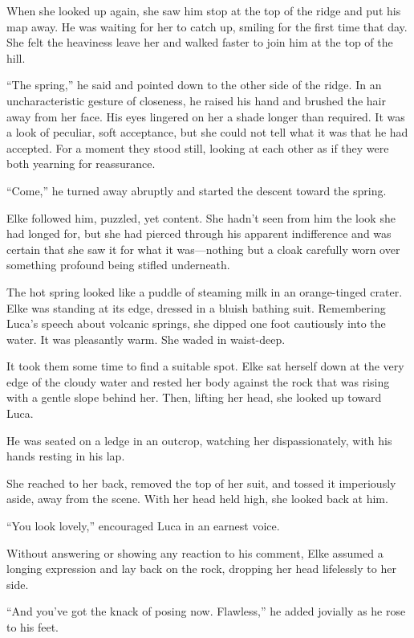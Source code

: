 When she looked up again, she saw him stop at the top of the ridge and put his map away. He was waiting for her to catch up, smiling for the first time that day. She felt the heaviness leave her and walked faster to join him at the top of the hill.

``The spring,'' he said and pointed down to the other side of the ridge. In an uncharacteristic gesture of closeness, he raised his hand and brushed the hair away from her face. His eyes lingered on her a shade longer than required. It was a look of peculiar, soft acceptance, but she could not tell what it was that he had accepted. For a moment they stood still, looking at each other as if they were both yearning for reassurance.

``Come,'' he turned away abruptly and started the descent toward the spring.

Elke followed him, puzzled, yet content. She hadn't seen from him the look she had longed for, but she had pierced through his apparent indifference and was certain that she saw it for what it was---nothing but a cloak carefully worn over something profound being stifled underneath.

\sectionline

The hot spring looked like a puddle of steaming milk in an orange-tinged crater. Elke was standing at its edge, dressed in a bluish bathing suit. Remembering Luca's speech about volcanic springs, she dipped one foot cautiously into the water. It was pleasantly warm. She waded in waist-deep.

It took them some time to find a suitable spot. Elke sat herself down at the very edge of the cloudy water and rested her body against the rock that was rising with a gentle slope behind her. Then, lifting her head, she looked up toward Luca.

He was seated on a ledge in an outcrop, watching her dispassionately, with his hands resting in his lap.

She reached to her back, removed the top of her suit, and tossed it imperiously aside, away from the scene. With her head held high, she looked back at him.

``You look lovely,'' encouraged Luca in an earnest voice.

Without answering or showing any reaction to his comment, Elke assumed a longing expression and lay back on the rock, dropping her head lifelessly to her side.

``And you've got the knack of posing now. Flawless,'' he added jovially as he rose to his feet.

